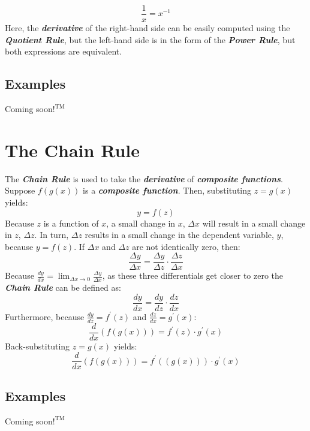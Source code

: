 %
\begin{equation}
\frac{1}{x} = x^{-1}
\end{equation}
%
Here, the \textbf{\textit{derivative}} of the right-hand side can be easily computed using the \textbf{\textit{Quotient Rule}}, but the left-hand side is in the form of the \textbf{\textit{Power Rule}}, but both expressions are equivalent.
%
\begin{center}
\section*{\small Examples}
Coming soon$!^{\text{TM}}$
\end{center}

\section{The Chain Rule}
The \textbf{\textit{Chain Rule}} is used to take the \textbf{\textit{derivative}} of \textbf{\textit{composite functions}}. Suppose $f(g(x))$ is a \textbf{\textit{composite function}}. Then, substituting $z = g(x)$ yields:
%
\begin{equation}
y = f(z)
\end{equation}
%
Because $z$ is a function of $x$, a small change in $x$, $\Delta x$ will result in a small change in $z$, $\Delta z$. In turn, $\Delta z$ results in a small change in the dependent variable, $y$, because $y = f(z)$. If $\Delta x$ and $\Delta z$ are not identically zero, then:
%
\begin{equation}
\frac{\Delta y}{\Delta x} = \frac{\Delta y}{\Delta z} \cdot \frac{\Delta z}{\Delta x}
\end{equation}
%
Because $\frac{dy}{dx} = \lim_{\Delta x \rightarrow 0} \frac{\Delta y}{\Delta x}$, as these three differentials get closer to zero the \textbf{\textit{Chain Rule}} can be defined as:
%
\begin{equation}
\frac{dy}{dx} = \frac{dy}{dz} \cdot \frac{dz}{dx}
\end{equation}
%
Furthermore, because $\frac{dy}{dz} = f^\prime(z)$ and $\frac{dz}{dx} = g^\prime(x)$:
%
\begin{equation}
\frac{d}{dx}\left(f\left(g\left(x\right)\right)\right) = f^\prime\left(z\right) \cdot g^\prime(x)
\end{equation}
%
Back-substituting $z = g(x)$ yields:
%
\begin{equation}
\frac{d}{dx}\left(f\left(g\left(x\right)\right)\right) = f^\prime \left(\left(g\left(x\right)\right)\right) \cdot g^\prime(x)
\end{equation}
%
\begin{center}
\section*{\small Examples}
Coming soon$!^{\text{TM}}$
\end{center}

